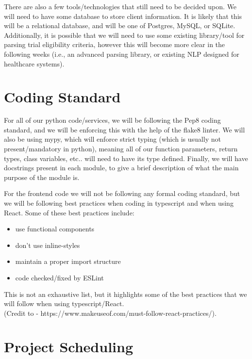 \documentclass{article}
\begin{document}
There are also a few tools/technologies that still need to be decided upon. We will need to have some database to store
client information. It is likely that this will be a relational database, and will be one of Postgres, MySQL, or SQLite.
Additionally, it is possible that we will need to use some existing library/tool for parsing trial eligibility criteria, however this
will become more clear in the following weeks (i.e., an advanced parsing library, or existing NLP designed for healthcare systems).

\section{Coding Standard}

For all of our python code/services, we will be following the Pep8 coding standard, and we will be enforcing this
with the help of the flake8 linter. We will also be using mypy, which will enforce strict typing (which is usually not present/mandatory
in python), meaning all of our function parameters, return types, class variables, etc.. will need to have its type defined. Finally, we will
have docstrings present in each module, to give a brief description of what the main purpose of the module is.

For the frontend code we will not be following any formal coding standard, but we will be following best practices
when coding in typescript and when using React. Some of these best practices include:
\begin{itemize}
	\item use functional components
	\item don't use inline-styles
	\item maintain a proper import structure
	\item code checked/fixed by ESLint
\end{itemize}

This is not an exhaustive list, but it highlights some of the best practices that we will follow when using typescript/React.\\
(Credit to - https://www.makeuseof.com/must-follow-react-practices/).

\section{Project Scheduling}
\end{document}
